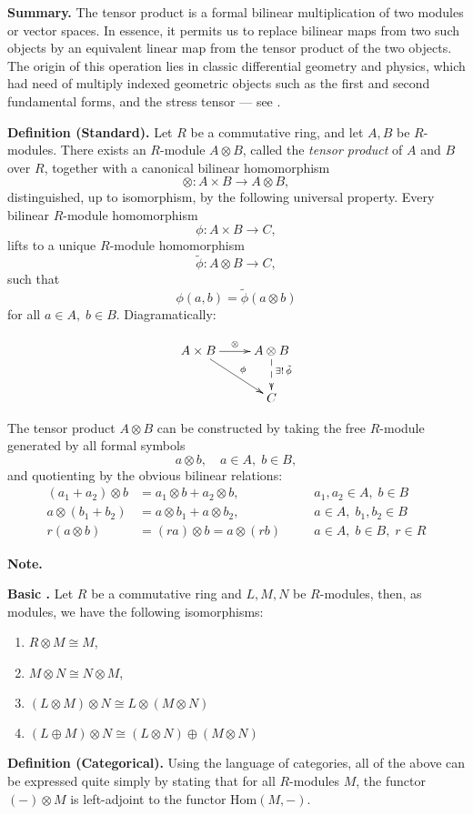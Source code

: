 \documentclass{article}
\begin{document}
{\bf Summary.}  The tensor product is a formal bilinear multiplication
of two modules or vector spaces.  In essence, it permits us to replace
bilinear maps from two such objects by an equivalent linear map from
the tensor product of the two objects.  The origin of this operation
lies in classic differential geometry and physics, which had need of
multiply indexed geometric objects such as the first and second
fundamental forms, and the stress tensor --- see .

{\bf Definition (Standard).} Let $R$ be a commutative ring, and let $A,
B$ be $R$-modules. There exists an $R$-module $A\otimes B$, called the
\emph{tensor product} of $A$ and $B$ over $R$, together with a canonical
bilinear homomorphism
$$\otimes: A\times B\rightarrow A\otimes B,$$
distinguished, up to isomorphism, by the following universal
property.
Every bilinear $R$-module homomorphism
$$\phi: A\times B\rightarrow C,$$
lifts to a unique $R$-module homomorphism
$$\tilde{\phi}: A\otimes B\rightarrow C,$$
such that
$$\phi(a,b) = \tilde{\phi}(a\otimes b)$$
for all $a\in A,\; b\in B.$  Diagramatically:

$$
\xymatrix{\ar[dr]^(.55)\phi \ar[r]^\otimes A\times B& A\otimes B
  \ar@{-->}[d]^(.4){\exists !\, \tilde{\phi}}\\  &C}
$$

The tensor product $A\otimes B$ can be constructed by taking the free
$R$-module generated by all formal symbols 
$$a\otimes b,\quad a\in A,\;b\in B,$$
and quotienting by the obvious bilinear relations:
\begin{align*}
  (a_1+a_2)\otimes b &= a_1\otimes b + a_2\otimes b,\quad &&a_1,a_2\in
  A,\; b\in B \\
  a\otimes(b_1+b_2) &= a\otimes b_1 +  a\otimes b_2,\quad &&a\in A,\;b_1,b_2\in
  B \\
  r(a\otimes b) &= (ra)\otimes b= a\otimes (rb)\quad &&a\in A,\;b\in
  B,\; r\in R  
\end{align*}

{\bf Note.} 

{\bf Basic .} Let $R$ be a commutative ring and $L,M,N$ be $R$-modules, then, as modules, we have the following isomorphisms:
\begin{enumerate}
\item $R\otimes M\cong M$,
\item $M\otimes N\cong N\otimes M$,
\item $(L\otimes M) \otimes N\cong L\otimes (M\otimes N)$
\item $(L\oplus M)\otimes N \cong (L\otimes N) \oplus (M\otimes N)$
\end{enumerate}

{\bf Definition (Categorical).} Using the language of categories, all
of the above can be expressed quite simply by stating that for all
$R$-modules $M$, the functor $ (-) \otimes M$ is left-adjoint to the
functor $\mathrm{Hom}(M,-)$.
\end{document}

